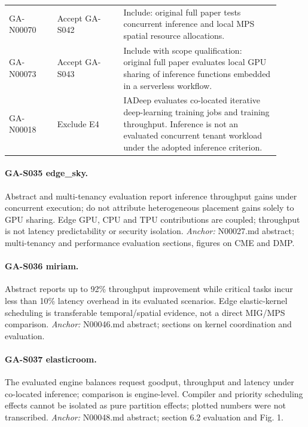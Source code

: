 \begin{longtable}{P{0.16\linewidth}P{0.22\linewidth}P{0.52\linewidth}}
GA-N00070 & Accept GA-S042 \cite{deinfer} & Include: original full paper tests concurrent inference and local MPS spatial resource allocations.\\

GA-N00073 & Accept GA-S043 \cite{esg} & Include with scope qualification: original full paper evaluates local GPU sharing of inference functions embedded in a serverless workflow.\\

GA-N00018 & Exclude E4 & IADeep evaluates co-located iterative deep-learning training jobs and training throughput. Inference is not an evaluated concurrent tenant workload under the adopted inference criterion.\\

\bottomrule\end{longtable}

\paragraph{GA-S035 edge\_sky.} Abstract and multi-tenancy evaluation report inference throughput gains under concurrent execution; do not attribute heterogeneous placement gains solely to GPU sharing. Edge GPU, CPU and TPU contributions are coupled; throughput is not latency predictability or security isolation. \textit{Anchor:} N00027.md abstract; multi-tenancy and performance evaluation sections, figures on CME and DMP.

\paragraph{GA-S036 miriam.} Abstract reports up to 92\% throughput improvement while critical tasks incur less than 10\% latency overhead in its evaluated scenarios. Edge elastic-kernel scheduling is transferable temporal/spatial evidence, not a direct MIG/MPS comparison. \textit{Anchor:} N00046.md abstract; sections on kernel coordination and evaluation.

\paragraph{GA-S037 elasticroom.} The evaluated engine balances request goodput, throughput and latency under co-located inference; comparison is engine-level. Compiler and priority scheduling effects cannot be isolated as pure partition effects; plotted numbers were not transcribed. \textit{Anchor:} N00048.md abstract; section 6.2 evaluation and Fig. 1.


